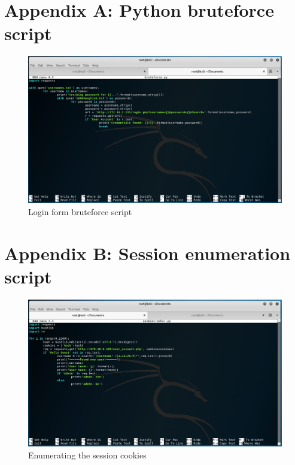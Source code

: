 \documentclass{report}
\begin{document}
\section{Appendix A: Python bruteforce script}
\begin{figure}[!htb]
	\centering
	\includegraphics[scale=0.4]{img/bruteforcescript.png}
	\caption{Login form bruteforce script}
\end{figure}
\section{Appendix B: Session enumeration script}
\begin{figure}[!htb]
	\centering
	\includegraphics[scale=0.4]{img/cookiescript.png}
	\caption{Enumerating the session cookies}
\end{figure}


\end{document}
